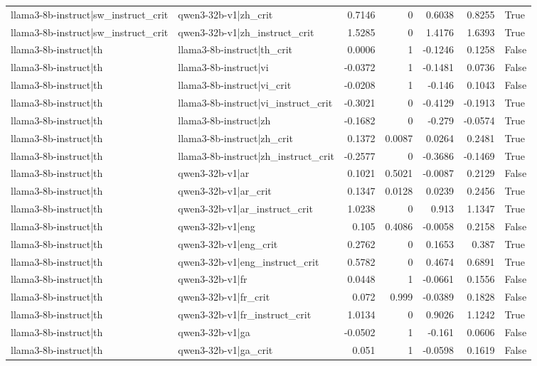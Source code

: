 \begin{table}
\begin{tabular}{l l r r r r l}
llama3-8b-instruct|sw_instruct_crit & qwen3-32b-v1|zh_crit & 0.7146 & 0 & 0.6038 & 0.8255 & True \\
llama3-8b-instruct|sw_instruct_crit & qwen3-32b-v1|zh_instruct_crit & 1.5285 & 0 & 1.4176 & 1.6393 & True \\
llama3-8b-instruct|th & llama3-8b-instruct|th_crit & 0.0006 & 1 & -0.1246 & 0.1258 & False \\
llama3-8b-instruct|th & llama3-8b-instruct|vi & -0.0372 & 1 & -0.1481 & 0.0736 & False \\
llama3-8b-instruct|th & llama3-8b-instruct|vi_crit & -0.0208 & 1 & -0.146 & 0.1043 & False \\
llama3-8b-instruct|th & llama3-8b-instruct|vi_instruct_crit & -0.3021 & 0 & -0.4129 & -0.1913 & True \\
llama3-8b-instruct|th & llama3-8b-instruct|zh & -0.1682 & 0 & -0.279 & -0.0574 & True \\
llama3-8b-instruct|th & llama3-8b-instruct|zh_crit & 0.1372 & 0.0087 & 0.0264 & 0.2481 & True \\
llama3-8b-instruct|th & llama3-8b-instruct|zh_instruct_crit & -0.2577 & 0 & -0.3686 & -0.1469 & True \\
llama3-8b-instruct|th & qwen3-32b-v1|ar & 0.1021 & 0.5021 & -0.0087 & 0.2129 & False \\
llama3-8b-instruct|th & qwen3-32b-v1|ar_crit & 0.1347 & 0.0128 & 0.0239 & 0.2456 & True \\
llama3-8b-instruct|th & qwen3-32b-v1|ar_instruct_crit & 1.0238 & 0 & 0.913 & 1.1347 & True \\
llama3-8b-instruct|th & qwen3-32b-v1|eng & 0.105 & 0.4086 & -0.0058 & 0.2158 & False \\
llama3-8b-instruct|th & qwen3-32b-v1|eng_crit & 0.2762 & 0 & 0.1653 & 0.387 & True \\
llama3-8b-instruct|th & qwen3-32b-v1|eng_instruct_crit & 0.5782 & 0 & 0.4674 & 0.6891 & True \\
llama3-8b-instruct|th & qwen3-32b-v1|fr & 0.0448 & 1 & -0.0661 & 0.1556 & False \\
llama3-8b-instruct|th & qwen3-32b-v1|fr_crit & 0.072 & 0.999 & -0.0389 & 0.1828 & False \\
llama3-8b-instruct|th & qwen3-32b-v1|fr_instruct_crit & 1.0134 & 0 & 0.9026 & 1.1242 & True \\
llama3-8b-instruct|th & qwen3-32b-v1|ga & -0.0502 & 1 & -0.161 & 0.0606 & False \\
llama3-8b-instruct|th & qwen3-32b-v1|ga_crit & 0.051 & 1 & -0.0598 & 0.1619 & False \\

\end{tabular}
\end{table}
